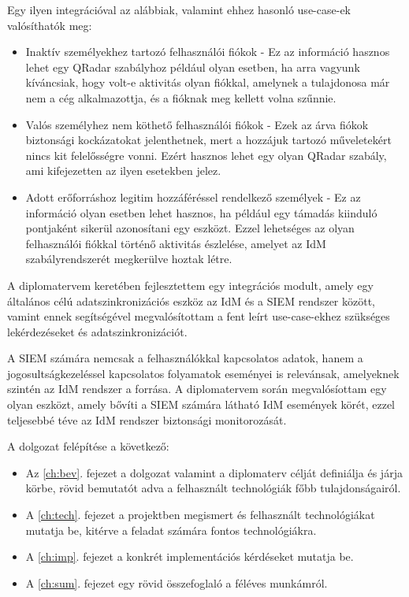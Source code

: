 Egy ilyen integrációval az alábbiak, valamint ehhez hasonló use-case-ek valósíthatók meg:

\begin{itemize}
	\item Inaktív személyekhez tartozó felhasználói fiókok - Ez az információ hasznos lehet egy QRadar szabályhoz például olyan esetben, ha arra vagyunk kíváncsiak, hogy volt-e aktivitás olyan fiókkal, amelynek a tulajdonosa már nem a cég alkalmazottja, és a fióknak meg kellett volna szűnnie.
	
	\item Valós személyhez nem köthető felhasználói fiókok - Ezek az árva fiókok biztonsági kockázatokat jelenthetnek, mert a hozzájuk tartozó műveletekért nincs kit felelősségre vonni. Ezért hasznos lehet egy olyan QRadar szabály, ami kifejezetten az ilyen esetekben jelez.
	
	\item Adott erőforráshoz legitim hozzáféréssel rendelkező személyek - Ez az információ olyan esetben lehet hasznos, ha például egy támadás kiinduló pontjaként sikerül azonosítani egy eszközt. Ezzel lehetséges az olyan felhasználói fiókkal történő aktivitás észlelése, amelyet az IdM szabályrendszerét megkerülve hoztak létre.
\end{itemize}

A diplomatervem keretében fejlesztettem egy integrációs modult, amely egy általános célú adatszinkronizációs eszköz az IdM és a SIEM rendszer között, vamint ennek segítségével megvalósítottam a fent leírt use-case-ekhez szükséges lekérdezéseket és adatszinkronizációt.

A SIEM számára nemcsak a felhasználókkal kapcsolatos adatok, hanem a jogosultságkezeléssel kapcsolatos folyamatok eseményei is relevánsak, amelyeknek szintén az IdM rendszer a forrása. A diplomatervem során megvalósíottam egy olyan eszközt, amely bővíti a SIEM számára látható IdM események körét, ezzel teljesebbé téve az IdM rendszer biztonsági monitorozását.

A dolgozat felépítése a következő:

\begin{itemize}
	\item Az \ref{ch:bev}. fejezet a dolgozat valamint a diplomaterv célját definiálja és járja körbe, rövid bemutatót adva a felhasznált technológiák főbb tulajdonságairól.
	
	\item A \ref{ch:tech}. fejezet a projektben megismert és felhasznált technológiákat mutatja be, kitérve a feladat számára fontos technológiákra.
	
	\item A \ref{ch:imp}. fejezet a konkrét implementációs kérdéseket mutatja be.
	
	\item A \ref{ch:sum}. fejezet egy rövid összefoglaló a féléves munkámról.
	
\end{itemize}

